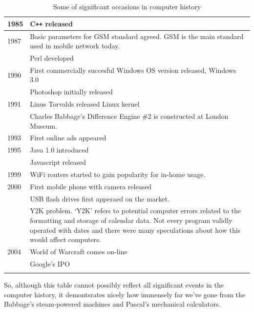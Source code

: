 \documentclass[../../what-is-computer]{subfiles}
\begin{document}
\begin{longtable}{p{}p{}}
        \midrule
        1985 & C\texttt{++} released \\
        \midrule
        1987 & Basic parameters for GSM standard agreed. GSM is the main standard used in mobile network today. \\
        \cmidrule(r){2-2}
            & Perl developed\\
        \midrule
        1990 & First commercially succesful Windows OS version released, Windows 3.0 \\
        \cmidrule(r){2-2}
            & Photoshop initially released \\
        \midrule
        1991 & Linus Torvalds released Linux kernel \\
        \cmidrule(r){2-2}
            & Charles Babbage's Difference Engine \#2 is constructed at London Museum. \\
        \midrule
        1993 & First online ads appeared \\
        \midrule
        1995 & Java 1.0 introduced \\
        \cmidrule(r){2-2}
            & Javascript released \\
        \midrule
        1999 & WiFi routers started to gain popularity for in-home usage. \\
        \midrule
        2000 & First mobile phone with camera released \\
        \cmidrule(r){2-2}
            & USB flash drives first apperaed on the market. \\
        \cmidrule(r){2-2}
            & Y2K problem. `Y2K' refers to potential computer errors related to the formatting and storage of calendar data. Not every program validly operated 
                with dates and there were many speculations about how this would affect computers.\\
        \midrule
        2004 & World of Warcraft comes on-line \\
        \cmidrule(r){2-2}
            & Google's IPO\\
        
        \bottomrule
        
        \caption{Some of significant occasions in computer history}
    \end{longtable}

    So, although this table cannot possibly reflect all significant events in the computer history, it demontsrates nicely how immensely far we've gone from the
    Babbage's steam-powered machines and Pascal's mechanical calculators. \par
\end{document}
